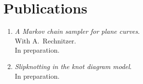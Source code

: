 \documentclass[letterpaper]{article}
\begin{document}
\section*{Publications}

\begin{enumerate}
\item \emph{A Markov chain sampler for plane curves}. \\
  With A.\ Rechnitzer. \\
  In preparation.
\item \emph{Slipknotting in the knot diagram model}. \\
  In preparation. 
  

\end{enumerate}
\end{document}
